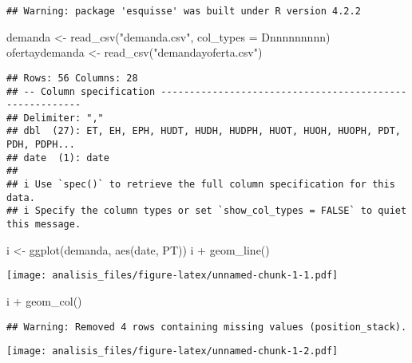 \documentclass[
]{article}
\newenvironment{Shaded}{\begin{snugshade}}{\end{snugshade}}
\newcommand{\AttributeTok}[1]{\textcolor[rgb]{0.77,0.63,0.00}{#1}}
\newcommand{\FunctionTok}[1]{\textcolor[rgb]{0.00,0.00,0.00}{#1}}
\newcommand{\NormalTok}[1]{#1}
\newcommand{\OtherTok}[1]{\textcolor[rgb]{0.56,0.35,0.01}{#1}}
\newcommand{\SpecialCharTok}[1]{\textcolor[rgb]{0.00,0.00,0.00}{#1}}
\newcommand{\StringTok}[1]{\textcolor[rgb]{0.31,0.60,0.02}{#1}}
\begin{document}
\begin{verbatim}
## Warning: package 'esquisse' was built under R version 4.2.2
\end{verbatim}

\begin{Shaded}
\begin{Highlighting}[]
\NormalTok{demanda }\OtherTok{\textless{}{-}} \FunctionTok{read\_csv}\NormalTok{(}\StringTok{"demanda.csv"}\NormalTok{, }\AttributeTok{col\_types =} \StringTok{\textquotesingle{}Dnnnnnnnnn\textquotesingle{}}\NormalTok{)}
\NormalTok{ofertaydemanda }\OtherTok{\textless{}{-}} \FunctionTok{read\_csv}\NormalTok{(}\StringTok{"demandayoferta.csv"}\NormalTok{)}
\end{Highlighting}
\end{Shaded}

\begin{verbatim}
## Rows: 56 Columns: 28
## -- Column specification --------------------------------------------------------
## Delimiter: ","
## dbl  (27): ET, EH, EPH, HUDT, HUDH, HUDPH, HUOT, HUOH, HUOPH, PDT, PDH, PDPH...
## date  (1): date
## 
## i Use `spec()` to retrieve the full column specification for this data.
## i Specify the column types or set `show_col_types = FALSE` to quiet this message.
\end{verbatim}

\begin{Shaded}
\begin{Highlighting}[]
\NormalTok{i }\OtherTok{\textless{}{-}} \FunctionTok{ggplot}\NormalTok{(demanda, }\FunctionTok{aes}\NormalTok{(date, PT))}
\NormalTok{i }\SpecialCharTok{+} \FunctionTok{geom\_line}\NormalTok{()}
\end{Highlighting}
\end{Shaded}

\texttt{[image: analisis\_files/figure-latex/unnamed-chunk-1-1.pdf]}

\begin{Shaded}
\begin{Highlighting}[]
\NormalTok{i }\SpecialCharTok{+} \FunctionTok{geom\_col}\NormalTok{()}
\end{Highlighting}
\end{Shaded}

\begin{verbatim}
## Warning: Removed 4 rows containing missing values (position_stack).
\end{verbatim}

\texttt{[image: analisis\_files/figure-latex/unnamed-chunk-1-2.pdf]}
\end{document}
